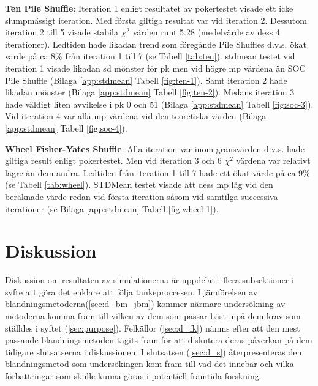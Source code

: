 \documentclass[swedish,a4paper]{article}
\begin{document}
\textbf{Ten Pile Shuffle}: Iteration 1 enligt resultatet av pokertestet visade
ett icke slumpmässigt iteration. Med första giltiga resultat var vid iteration
2. Dessutom iteration 2 till 5 visade stabila $\chi^2$ värden runt 5.28
(medelvärde av dess 4 iterationer). Ledtiden hade likadan trend som föregånde
Pile Shuffles d.v.s. ökat värde på ca 8\% från iteration 1 till 7 (se Tabell
\ref{tab:ten}). \gls{stdmean} testet vid iteration 1 visade likadan \gls{sd}
mönster för \gls{pk} men vid högre \gls{mp} värdena än SOC Pile Shuffle (Bilaga
\ref{app:stdmean} Tabell \ref{fig:ten-1}). Samt iteration 2 hade likadan mönster
(Bilaga \ref{app:stdmean} Tabell \ref{fig:ten-2}). Medans iteration 3 hade
väldigt liten avvikelse i \gls{pk} 0 och 51 (Bilaga \ref{app:stdmean} Tabell
\ref{fig:soc-3}). Vid iteration 4 var alla \gls{mp} värdena vid den teoretiska
värden (Bilaga \ref{app:stdmean} Tabell \ref{fig:soc-4}).


\textbf{Wheel Fisher-Yates Shuffle}: Alla iteration var inom gränsvärden d.v.s.
hade giltiga result enligt pokertestet. Men vid iteration 3 och 6 $\chi^2$
värdena var relativt lägre än dem andra. Ledtiden från iteration 1 till 7 hade
ett ökat värde på ca 9\% (se Tabell \ref{tab:wheel}). STDMean testet visade att
dess \gls{mp} låg vid den beräknade värde redan vid första iteration såsom vid
samtilga successiva iterationer (se Bilaga \ref{app:stdmean} Tabell
\ref{fig:wheel-1}). 



\section{Diskussion}
Diskussion om resultaten av simulationerna är uppdelat i flera subsektioner i
syfte att göra det enklare att följa tankeproccesen.
I jämförelsen av
blandningsmetoderna(\ref{sec:d_bm_jbm}) kommer närmare undersökning av metoderna
komma fram till vilken av dem som passar bäst inpå dem krav som ställdes i
syftet (\ref{sec:purpose}). Felkällor (\ref{sec:d_fk}) nämns efter att den mest
passande blandningsmetoden tagits fram för att diskutera deras påverkan på dem
tidigare slutsatserna i diskussionen. I slutsatsen (\ref{sec:d_s})
återpresenteras den blandningsmetod som undersökingen kom fram till vad det
innebär och vilka förbättringar som skulle kunna göras i potentiell framtida
forskning.

\end{document}

